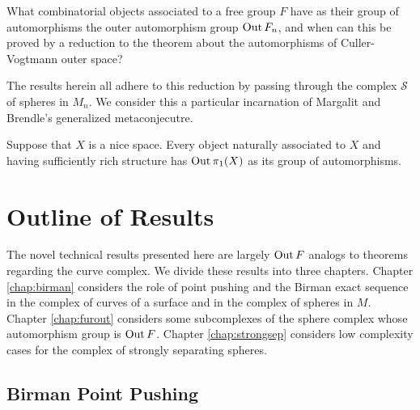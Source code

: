 \begin{question}
  What combinatorial objects associated to a free group $F$ have as their group of automorphisms
  the outer automorphism group $\operatorname{Out} F_n$, and when can this
  be proved by a reduction to the theorem about the automorphisms of Culler-Vogtmann outer space?
\end{question}
The results herein all adhere to this reduction by passing through the complex $\mathcal S$ of spheres in $M_n$.
We consider this a particular incarnation of Margalit and Brendle's generalized metaconjecutre.
\begin{metaconjecture}
  Suppose that $X$ is a nice space. Every object naturally associated to $X$ and having sufficiently
  rich structure has $\operatorname{Out} \pi_1(X)$ as its group of automorphisms.
\end{metaconjecture}

\section{Outline of Results}

The novel technical results presented here are largely $\operatorname{Out} F$ analogs to theorems regarding the curve complex.
We divide these results into three chapters.
Chapter \ref{chap:birman} considers the role of point pushing and the Birman exact sequence in the complex of curves of a surface and in the complex of spheres in $M$.
Chapter \ref{chap:furout} considers some subcomplexes of the sphere complex whose automorphism group is $\operatorname{Out} F$.
Chapter \ref{chap:strongsep} considers low complexity cases for the complex of strongly separating spheres.

\subsection{Birman Point Pushing}

